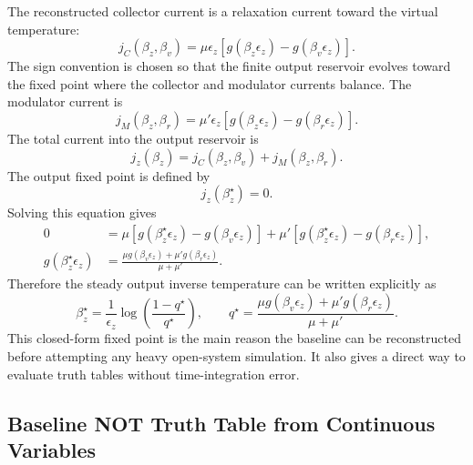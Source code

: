 \documentclass[11pt]{article}
\begin{document}
The reconstructed collector current is a relaxation current toward the virtual temperature:
\begin{equation}
    j_C(\beta_z,\beta_v)
    =
    \mu\epsilon_z
    \left[
        g(\beta_z\epsilon_z)-g(\beta_v\epsilon_z)
    \right].
\end{equation}
The sign convention is chosen so that the finite output reservoir evolves toward the fixed
point where the collector and modulator currents balance.  The modulator current is
\begin{equation}
    j_M(\beta_z,\beta_r)
    =
    \mu'\epsilon_z
    \left[
        g(\beta_z\epsilon_z)-g(\beta_r\epsilon_z)
    \right].
\end{equation}
The total current into the output reservoir is
\begin{equation}
    j_z(\beta_z)
    =
    j_C(\beta_z,\beta_v)+j_M(\beta_z,\beta_r).
\end{equation}
The output fixed point is defined by
\begin{equation}
    j_z(\beta_z^\star)=0 .
\end{equation}
Solving this equation gives
\begin{align}
    0
    &=
    \mu\left[g(\beta_z^\star\epsilon_z)-g(\beta_v\epsilon_z)\right]
    +
    \mu'\left[g(\beta_z^\star\epsilon_z)-g(\beta_r\epsilon_z)\right],\\
    g(\beta_z^\star\epsilon_z)
    &=
    \frac{\mu g(\beta_v\epsilon_z)+\mu' g(\beta_r\epsilon_z)}
         {\mu+\mu'} .
\end{align}
Therefore the steady output inverse temperature can be written explicitly as
\begin{equation}
    \beta_z^\star
    =
    \frac{1}{\epsilon_z}
    \log\left(
        \frac{1-q^\star}{q^\star}
    \right),
    \qquad
    q^\star
    =
    \frac{\mu g(\beta_v\epsilon_z)+\mu' g(\beta_r\epsilon_z)}
         {\mu+\mu'} .
\end{equation}
This closed-form fixed point is the main reason the baseline can be reconstructed before
attempting any heavy open-system simulation.  It also gives a direct way to evaluate truth
tables without time-integration error.

\subsection{Baseline NOT Truth Table from Continuous Variables}
\end{document}
